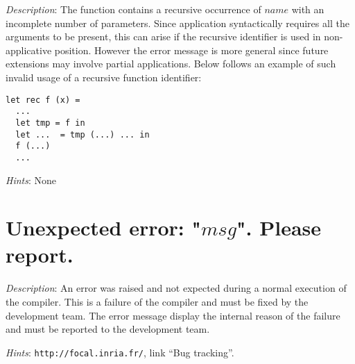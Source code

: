 {\em Description}: The function contains a recursive occurrence of
$name$ with an incomplete number of parameters. Since application
syntactically requires all the arguments to be present, this can arise
if the recursive identifier is used in non-applicative
position. However the error message is more general since future
extensions may involve partial applications. Below follows an example
of such invalid usage of a recursive function identifier:
{\scriptsize
\begin{lstlisting}
let rec f (x) =
  ...
  let tmp = f in
  let ...  = tmp (...) ... in
  f (...)
  ...
\end{lstlisting}
}

{\em Hints}: None



\section*{Unexpected error: "$msg$". Please report.}

{\em Description}: An error was raised and not expected during a
normal execution of the compiler. This is a failure of the compiler
and must be fixed by the {\focal} development team. The error message
display the internal reason of the failure and must be reported to the
{\focal} development team.

{\em Hints}: \verb+http://focal.inria.fr/+, link ``Bug tracking''.
